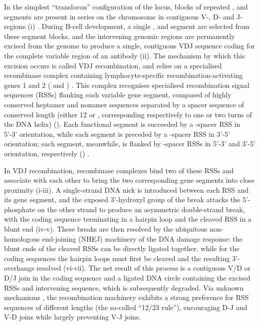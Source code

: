 In the simplest ``translocon'' configuration of the \igh{} locus, blocks of repeated \vh, \dh and \jh segments are present in series on the chromosome in contiguous V-, D- and J-regions (i) \parencite{schroeder2010immunoglobulins,jung2006vdjr}. During B-cell development, a single \vh, \dh and \jh segment are selected from these segment blocks, and the intervening genomic regions are permanently excised from the genome to produce a single, contiguous VDJ sequence coding for the complete variable region of an antibody (ii). The mechanism by which this excision occurs is called VDJ recombination, and relies on a specialised recombinase complex containing lymphocyte-specific recombination-activating genes 1 and 2 ( and ) \parencite{jung2006vdjr,schatz2011vdjr}. This complex recognises specialised recombination signal sequences (RSSs) flanking each variable gene segment, composed of highly conserved heptamer and nonamer sequences separated by a spacer sequence of conserved length (either 12 or , corresponding respectively to one or two turns of the DNA helix) \parencite{hesse1989rss} (). Each functional \vh segment is succeeded by a -spacer RSS in 5'-3' orientation, while each \jh segment is preceded by a -spacer RSS in 3'-5' orientation; each \dh segment, meanwhile, is flanked by -spacer RSSs in 5'-3' and 3'-5' orientation, respectively () \parencite{schatz2011vdjr}. 

In VDJ recombination, recombinase complexes bind two of these RSSs and associate with each other to bring the two corresponding gene segments into close proximity (i-iii). A single-strand DNA nick is introduced between each RSS and its gene segment, and the exposed 3'-hydroxyl group of the break attacks the 5'-phosphate on the other strand to produce an asymmetric double-strand break, with the coding sequence terminating in a hairpin loop and the cleaved RSS in a blunt end \parencite{schroeder2010immunoglobulins,schatz2011vdjr} (iv-v). These breaks are then resolved by the ubiquitous non-homologous end-joining (NHEJ) machinery of the DNA damage response: the blunt ends of the cleaved RSSs can be directly ligated together, while for the coding sequences the hairpin loops must first be cleaved and the resulting 3'-overhangs resolved \parencite{schroeder2010immunoglobulins,schatz2011vdjr} (vi-vii). The net result of this process is a contiguous V/D or D/J join in the coding sequence and a ligated DNA circle containing the excised RSSs and intervening sequence, which is subsequently degraded. Via unknown mechanisms \parencite{schatz2011vdjr}, the recombination machinery exhibits a strong preference for RSS sequences of different lengths (the so-called ``12/23 rule''), encouraging  D-J and V-D joins while largely preventing V-J joins. 

